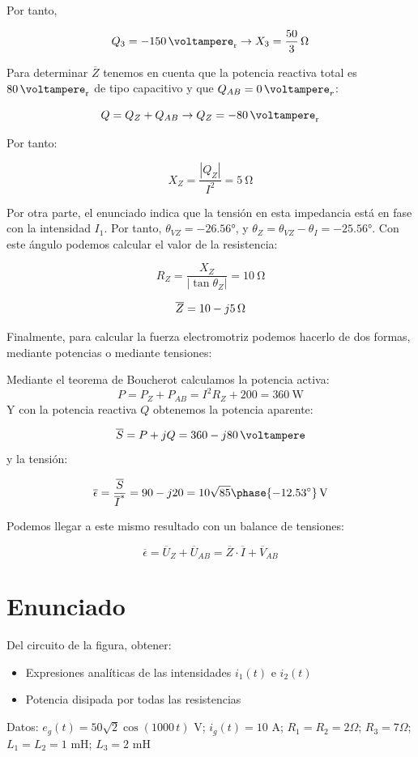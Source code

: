 Por tanto,

\[
   Q_3 = -\qty{150}{\voltampere_r} \rightarrow X_3 = \qty[parse-numbers=false]{\frac{50}{3}}{\ohm}
\]

Para determinar $\overline{Z}$ tenemos en cuenta que la potencia reactiva total es $\qty{80}{\voltampere_r}$ de tipo capacitivo y que $Q_{AB} = \qty{0}{\voltampere}_r$:

\[
  Q = Q_Z + Q_{AB} \rightarrow Q_Z = -\qty{80}{\voltampere_r} 
\]

Por tanto:

\[
  X_Z = \frac{|Q_Z|}{I^2} = \qty{5}{\ohm}
\]

Por otra parte, el enunciado indica que la tensión en esta impedancia está en fase con la intensidad $I_1$. Por tanto, $\theta_{VZ} = \ang{-26.56}$, y $\theta_Z = \theta_{VZ} - \theta_{I} = \ang{-25.56}$. Con este ángulo podemos calcular el valor de la resistencia:

\[
  R_Z = \frac{X_Z}{|\tan\theta_Z|} = \qty{10}{\ohm}
\]

\[
  \overline{Z} =  \qty[parse-numbers=false]{10 - j5}{\ohm}
\]

Finalmente, para calcular la fuerza electromotriz podemos hacerlo de dos formas, mediante potencias o mediante tensiones:

Mediante el teorema de Boucherot calculamos la potencia activa:
\[
P = P_Z + P_{AB} = I^2 R_Z + 200 = \qty{360}{\watt}
\]
Y con la potencia reactiva $Q$ obtenemos la potencia aparente:

\[
  \overline{S} = P + jQ = \qty[parse-numbers=false]{360 -j80}{\voltampere}
\]
y la tensión:

\[
  \overline{\epsilon} = \frac{\overline{S}}{\overline{I}^*} = 90 - j20 = \qty[parse-numbers=false]{10\sqrt{85}\phase{\ang{-12.53}}}{\volt}
\]

Podemos llegar a este mismo resultado con un balance de tensiones:

\[
  \overline{\epsilon} = \overline{U}_Z + \overline{U}_{AB} = \overline{Z} \cdot \overline{I} + \overline{V}_{AB}
\]

\section{Enunciado}
Del circuito de la figura, obtener:
\begin{itemize}
\item Expresiones analíticas de las intensidades $i_1(t)$ e $i_2(t)$
\item Potencia disipada por todas las resistencias
\end{itemize}
Datos: $e_g(t)=50\sqrt{2} \cos(1000\,t)$ V; $i_g(t)=10$ A;
$R_1=R_2=2\Omega$; $R_3=7\Omega$; $L_1=L_2=1$ mH; $L_3=2$ mH

